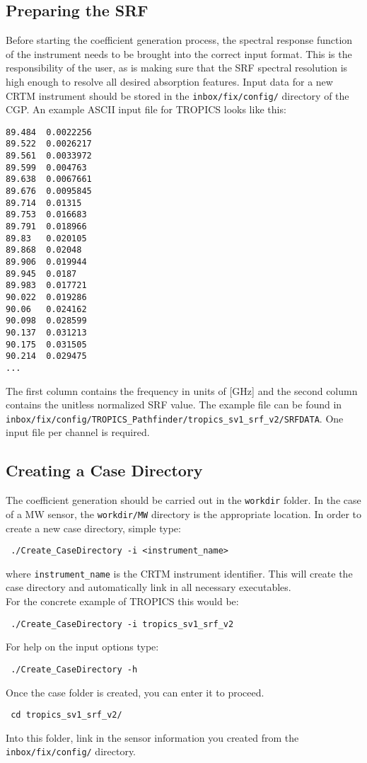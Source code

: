 \subsection{Preparing the SRF}
Before starting the coefficient generation process, the spectral response function of the instrument needs to be brought into the correct input format. 
This is the responsibility of the user, as is making sure that the SRF spectral resolution is high enough to resolve all desired absorption features.
Input data for a new CRTM instrument should be stored in the \verb|inbox/fix/config/| directory of the CGP.
An example ASCII input file for TROPICS looks like this:
\begin{verbatim}
89.484  0.0022256
89.522  0.0026217
89.561  0.0033972
89.599  0.004763
89.638  0.0067661
89.676  0.0095845
89.714  0.01315
89.753  0.016683
89.791  0.018966
89.83   0.020105
89.868  0.02048
89.906  0.019944
89.945  0.0187
89.983  0.017721
90.022  0.019286
90.06   0.024162
90.098  0.028599
90.137  0.031213
90.175  0.031505
90.214  0.029475
...
\end{verbatim}
The first column contains the frequency in units of [GHz] and the second column contains the unitless normalized SRF value.
The example file can be found in \verb|inbox/fix/config/TROPICS_Pathfinder/tropics_sv1_srf_v2/SRFDATA|.
One input file per channel is required.

\subsection{Creating a Case Directory}
The coefficient generation should be carried out in the \verb|workdir| folder.
In the case of a MW sensor, the \verb|workdir/MW| directory is the appropriate location.
In order to create a new case directory, simple type:
\begin{verbatim}
 ./Create_CaseDirectory -i <instrument_name>
\end{verbatim}
where \verb|instrument_name| is the CRTM instrument identifier. This will create the case directory and automatically link in all necessary executables.\\
For the concrete example of TROPICS this would be:
\begin{verbatim}
 ./Create_CaseDirectory -i tropics_sv1_srf_v2
\end{verbatim}
For help on the input options type:
\begin{verbatim}
 ./Create_CaseDirectory -h
\end{verbatim}
Once the case folder is created, you can enter it to proceed.
\begin{verbatim}
 cd tropics_sv1_srf_v2/
\end{verbatim}
Into this folder, link in the sensor information you created from the \verb|inbox/fix/config/| directory.

